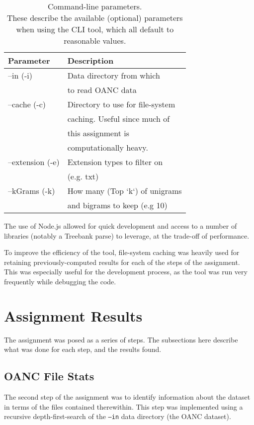 \documentclass[11pt]{article}
\begin{document}
\begin{table}[h]
\begin{center}
\begin{tabular}{|l|l|}
\hline \bf Parameter & \bf Description \\ \hline
--in (-i)            & Data directory from which \\
                     & to read OANC data \\
--cache (-c)         & Directory to use for file-system \\
                     & caching. Useful since much of \\
                     & this assignment is \\
                     & computationally heavy. \\
--extension (-e)     & Extension types to filter on \\
                     & (e.g. txt) \\
--kGrams (-k)        & How many (Top `k`) of unigrams \\
                     & and bigrams to keep (e.g 10) \\
\hline
\end{tabular}
\end{center}
\caption{\label{cliParams} Command-line parameters. \\
These describe the available (optional) parameters when using
the CLI tool, which all default to reasonable values.}
\end{table}

The use of Node.js allowed for quick development and access to a number
of libraries (notably a Treebank parse) to leverage, at the trade-off of performance.

To improve the efficiency of the tool, file-system caching was heavily used for retaining
previously-computed results for each of the steps of the assignment.  This was especially
useful for the development process, as the tool was run very frequently while debugging
the code.

\section{Assignment Results}
The assignment was posed as a series of steps. The subsections here describe what was
done for each step, and the results found.

\subsection{OANC File Stats}
The second step of the assignment was to identify information about the dataset in terms
of the files contained therewithin.  This step was implemented using a recursive
depth-first-search of the {\tt --in} data directory (the OANC dataset).
\end{document}
